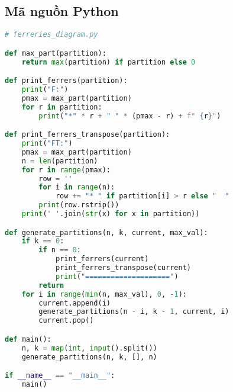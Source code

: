 \documentclass[12pt]{article}
\begin{document}
\subsection*{Mã nguồn Python}
\begin{lstlisting}[language=Python, basicstyle=\ttfamily\footnotesize, frame=single]
# ferreries_diagram.py

def max_part(partition):
    return max(partition) if partition else 0

def print_ferrers(partition):
    print("F:")
    pmax = max_part(partition)
    for r in partition:
        print("*" * r + " " * (pmax - r) + f" {r}")

def print_ferrers_transpose(partition):
    print("FT:")
    pmax = max_part(partition)
    n = len(partition)
    for r in range(pmax):
        row = ''
        for i in range(n):
            row += "* " if partition[i] > r else "  "
        print(row.rstrip())
    print(' '.join(str(x) for x in partition))

def generate_partitions(n, k, current, max_val):
    if k == 0:
        if n == 0:
            print_ferrers(current)
            print_ferrers_transpose(current)
            print("====================")
        return
    for i in range(min(n, max_val), 0, -1):
        current.append(i)
        generate_partitions(n - i, k - 1, current, i)
        current.pop()

def main():
    n, k = map(int, input().split())
    generate_partitions(n, k, [], n)

if __name__ == "__main__":
    main() 
\end{lstlisting}
\end{document}
